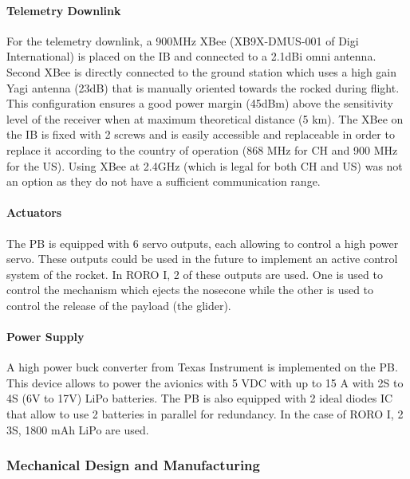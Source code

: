 \paragraph{Telemetry Downlink}
 \hfill \break
For the telemetry downlink, a 900MHz XBee (XB9X-DMUS-001 of Digi International) is placed on the IB and connected to a 2.1dBi omni antenna. Second XBee is directly connected to the ground station which uses a high gain Yagi antenna (23dB) that is manually oriented towards the rocked during flight. This configuration ensures a good power margin (45dBm) above the sensitivity level of the receiver when at maximum theoretical distance (5 km). The XBee on the IB is fixed with 2 screws and is easily accessible and replaceable in order to replace it according to the country of operation (868 MHz for CH and 900 MHz for the US). Using XBee at 2.4GHz (which is legal for both CH and US) was not an option as they do not have a sufficient communication range.

\paragraph{Actuators}
 \hfill \break
The PB is equipped with 6 servo outputs, each allowing to control a high power servo. These outputs could be used in the future to implement an active control system of the rocket. In RORO I, 2 of these outputs are used. One is used to control the mechanism which ejects the nosecone while the other is used to control the release of the payload (the glider). 

\paragraph{Power Supply}
 \hfill \break
A high power buck converter from Texas Instrument is implemented on the PB. This device allows to power the avionics with 5 VDC with up to 15 A with 2S to 4S (6V to 17V) LiPo batteries. The PB is also equipped with 2 ideal diodes IC that allow to use 2 batteries in parallel for redundancy. In the case of RORO I, 2 3S, 1800 mAh LiPo are used. 


\subsubsection{Mechanical Design and Manufacturing}
